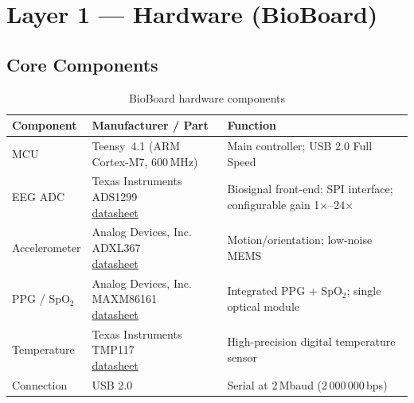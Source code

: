 \documentclass[11pt,a4paper]{article}
\begin{document}
\section{Layer 1 — Hardware (BioBoard)}
\label{sec:hardware}

\subsection{Core Components}

\begin{table}[H]
\centering
\caption{BioBoard hardware components}
\label{tab:hw-components}
\begin{tabularx}{\textwidth}{l l X}
\toprule
\textbf{Component} & \textbf{Manufacturer / Part} & \textbf{Function} \\
\midrule
MCU          & Teensy~4.1 (ARM Cortex-M7, 600\,MHz)
             & Main controller; USB 2.0 Full Speed \\
EEG ADC      & \makecell[l]{Texas Instruments\\ADS1299\\\href{https://www.ti.com/lit/gpn/ads1299}{datasheet}}
             & Biosignal front-end; SPI interface; configurable gain 1$\times$--24$\times$ \\
Accelerometer & \makecell[l]{Analog Devices, Inc.\\ADXL367\\\href{https://www.analog.com/media/en/technical-documentation/data-sheets/adxl367.pdf}{datasheet}}
             & Motion/orientation; low-noise MEMS \\
PPG / SpO$_2$ & \makecell[l]{Analog Devices, Inc.\\MAXM86161\\\href{https://www.analog.com/media/en/technical-documentation/data-sheets/maxm86161.pdf}{datasheet}}
             & Integrated PPG + SpO$_2$; single optical module \\
Temperature  & \makecell[l]{Texas Instruments\\TMP117\\\href{https://www.ti.com/lit/gpn/tmp117}{datasheet}}
             & High-precision digital temperature sensor \\
Connection   & USB 2.0
             & Serial at 2\,Mbaud (2\,000\,000\,bps) \\
\bottomrule
\end{tabularx}
\end{table}
\end{document}
